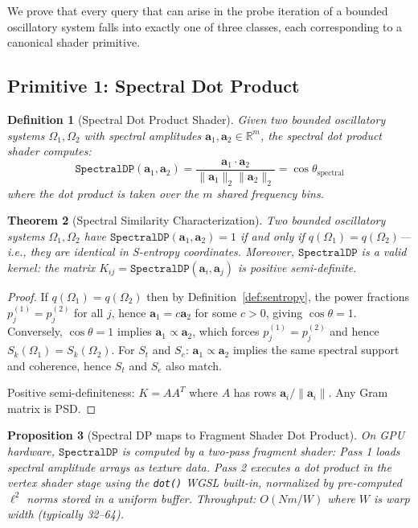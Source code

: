 \documentclass[10pt,twocolumn]{article}
\newtheorem{theorem}{Theorem}[section]
\newtheorem{proposition}[theorem]{Proposition}
\newtheorem{definition}[theorem]{Definition}
\newcommand{\R}{\mathbb{R}}
\begin{document}
We prove that every query that can arise in the probe iteration
of a bounded oscillatory system falls into exactly one of three classes,
each corresponding to a canonical shader primitive.

\subsection{Primitive 1: Spectral Dot Product}

\begin{definition}[Spectral Dot Product Shader]
\label{def:spectral-dot}
Given two bounded oscillatory systems $\Omega_1, \Omega_2$ with
spectral amplitudes $\mathbf{a}_1, \mathbf{a}_2 \in \R^m$,
the \emph{spectral dot product shader} computes:
\begin{equation}
\mathtt{SpectralDP}(\mathbf{a}_1, \mathbf{a}_2) = \frac{\mathbf{a}_1 \cdot \mathbf{a}_2}{\|\mathbf{a}_1\|_2 \|\mathbf{a}_2\|_2}
= \cos\theta_{\text{spectral}}
\label{eq:spectral-dp}
\end{equation}
where the dot product is taken over the $m$ shared frequency bins.
\end{definition}

\begin{theorem}[Spectral Similarity Characterization]
\label{thm:spectral-dp}
Two bounded oscillatory systems $\Omega_1, \Omega_2$ have
$\mathtt{SpectralDP}(\mathbf{a}_1, \mathbf{a}_2) = 1$ if and only if
$q(\Omega_1) = q(\Omega_2)$---i.e., they are identical in S-entropy coordinates.
Moreover, $\mathtt{SpectralDP}$ is a valid kernel:
the matrix $K_{ij} = \mathtt{SpectralDP}(\mathbf{a}_i, \mathbf{a}_j)$
is positive semi-definite.
\end{theorem}

\begin{proof}
If $q(\Omega_1) = q(\Omega_2)$ then by Definition~\ref{def:sentropy},
the power fractions $p_j^{(1)} = p_j^{(2)}$ for all $j$,
hence $\mathbf{a}_1 = c \mathbf{a}_2$ for some $c > 0$,
giving $\cos\theta = 1$.
Conversely, $\cos\theta = 1$ implies $\mathbf{a}_1 \propto \mathbf{a}_2$,
which forces $p_j^{(1)} = p_j^{(2)}$ and hence $S_k(\Omega_1) = S_k(\Omega_2)$.
For $S_t$ and $S_e$: $\mathbf{a}_1 \propto \mathbf{a}_2$ implies
the same spectral support and coherence, hence $S_t$ and $S_e$ also match.

Positive semi-definiteness: $K = AA^T$ where $A$ has rows $\mathbf{a}_i / \|\mathbf{a}_i\|$.
Any Gram matrix is PSD.
\end{proof}

\begin{proposition}[Spectral DP maps to Fragment Shader Dot Product]
\label{prop:dp-shader}
On GPU hardware, $\mathtt{SpectralDP}$ is computed by a two-pass fragment shader:
Pass 1 loads spectral amplitude arrays as texture data.
Pass 2 executes a dot product in the vertex shader stage using the
\texttt{dot()} WGSL built-in, normalized by pre-computed $\ell^2$ norms
stored in a uniform buffer.
Throughput: $O(Nm/W)$ where $W$ is warp width (typically 32--64).
\end{proposition}
\end{document}
